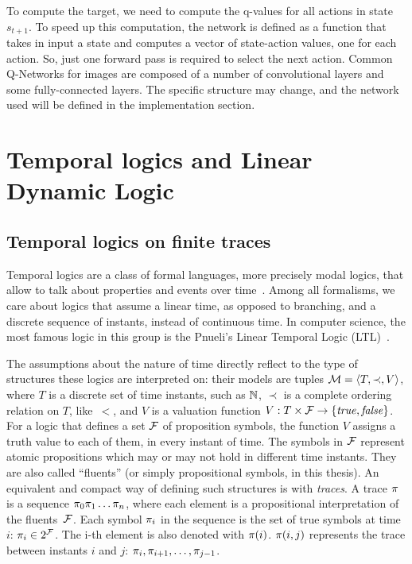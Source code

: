 To compute the target, we need to compute the q-values for all actions in
state $s_{t+1}$. To speed up this computation, the network is defined as a
function that takes in input a state and computes a vector of state-action
values, one for each action. So, just one forward pass is required to select
the next action. Common Q-Networks for images are composed of a number of
convolutional layers and some fully-connected layers. The specific structure
may change, and the network used will be defined in the implementation section.


\section{Temporal logics and Linear Dynamic Logic}


\subsection{Temporal logics on finite traces}

Temporal logics are a class of formal languages, more precisely modal logics,
that allow to talk about properties and events over
time~\cite{bib:temporal-logics-stanford}. Among all formalisms, we care about
logics that assume a linear time, as opposed to branching, and a discrete
sequence of instants, instead of continuous time.  In computer science, the
most famous logic in this group is the Pnueli's Linear Temporal Logic
(LTL)~\cite{bib:pnueli-ltl}.

The assumptions about the nature of time directly reflect to the type of
structures these logics are interpreted on: their models are tuples $\mathcal{M}
= \langle T, \prec, V \rangle$, where $T$ is a discrete set of time instants,
such as $\mathbb{N}$, $\prec$ is a complete ordering relation on $T$, like~$<$, and
$V$ is a valuation function $V: T \times \mathcal{F} \to \{\text{\textit{true}}, \text{\textit{false}}\}$. For
a logic that defines a set $\mathcal{F}$ of proposition symbols, the function $V$
assigns a truth value to each of them, in every instant of time. The symbols
in $\mathcal{F}$ represent atomic propositions which may or may not hold in
different time instants. They are also called ``fluents'' (or simply
propositional symbols, in this thesis). An equivalent and compact way of
defining such structures is with \emph{traces}. A trace $\pi$ is a sequence
$\pi_0 \pi_1 \dots \pi_n$, where each element is a propositional
interpretation of the fluents~$\mathcal{F}$. Each symbol $\pi_i$ in the
sequence is the set of true symbols at time~$i$: $\pi_i \in 2^{\mathcal{F}}$.
The i-th element is also denoted with $\pi(i)$. $\pi(i, j)$ represents
the trace between instants $i$ and $j$: $\pi_i, \pi_{i+1}, \dots,
\pi_{j-1}$.

